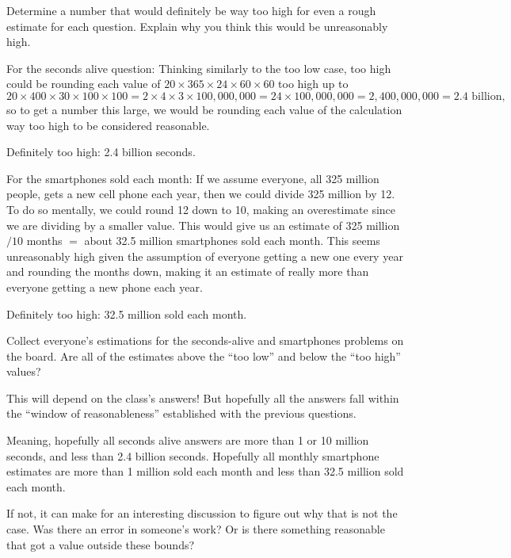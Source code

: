 \documentclass[12pt]{ximera}
\begin{document}
\begin{problem}
Determine a number that would definitely be way too high for even a rough estimate for
each question. Explain why you think this would be unreasonably high.

\begin{freeResponse}
\end{freeResponse}

\begin{solution}
For the seconds alive question: Thinking similarly to the too low case, too high could
be rounding each value of $20 \times 365 \times 24 \times 60 \times 60$ too high up to
\[
20 \times 400 \times 30 \times 100 \times 100 = 2 \times 4 \times 3 \times 100{,}000{,}000
= 24 \times 100{,}000{,}000 = 2{,}400{,}000{,}000 = 2.4 \text{ billion},
\]
so to get a number this large, we would be rounding each value of the calculation way
too high to be considered reasonable.

Definitely too high: 2.4 billion seconds.

For the smartphones sold each month: If we assume everyone, all 325 million people, gets
a new cell phone each year, then we could divide 325 million by 12. To do so mentally, we
could round 12 down to 10, making an overestimate since we are dividing by a smaller
value. This would give us an estimate of 325 million $/10$ months $=$ about 32.5 million
smartphones sold each month. This seems unreasonably high given the assumption of
everyone getting a new one every year and rounding the months down, making it an estimate
of really more than everyone getting a new phone each year.

Definitely too high: 32.5 million sold each month.
\end{solution}
\end{problem}

\begin{problem}
Collect everyone's estimations for the seconds-alive and smartphones problems on the
board. Are all of the estimates above the ``too low'' and below the ``too high'' values?

\begin{freeResponse}
\end{freeResponse}

\begin{solution}
This will depend on the class's answers! But hopefully all the answers fall within the
``window of reasonableness'' established with the previous questions.

Meaning, hopefully all seconds alive answers are more than 1 or 10 million seconds, and
less than 2.4 billion seconds. Hopefully all monthly smartphone estimates are more than
1 million sold each month and less than 32.5 million sold each month.

If not, it can make for an interesting discussion to figure out why that is not the
case. Was there an error in someone's work? Or is there something reasonable that got a
value outside these bounds?
\end{solution}
\end{problem}
\end{document}
